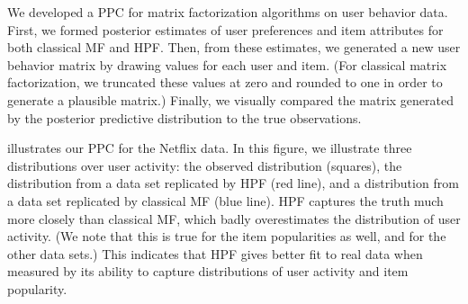 We developed a PPC for matrix factorization algorithms on user
behavior data.  First, we formed posterior estimates of user
preferences and item attributes for both classical MF and HPF.  Then,
from these estimates, we generated a new user behavior matrix by
drawing values for each user and item.  (For classical matrix
factorization, we truncated these values at zero and rounded to one in
order to generate a plausible matrix.)  Finally, we visually compared
the matrix generated by the posterior predictive distribution to the
true observations.

 illustrates our PPC for the Netflix data.  In this figure, we
illustrate three distributions over user activity: the observed
distribution (squares), the distribution from a data set replicated by
HPF (red line), and a distribution from a data set replicated by
classical MF (blue line).  HPF captures the truth much more closely
than classical MF, which badly overestimates the distribution of user
activity.  (We note that this is true for the item popularities as
well, and for the other data sets.) This indicates that HPF gives
better fit to real data when measured by its ability to capture
distributions of user activity and item popularity.



